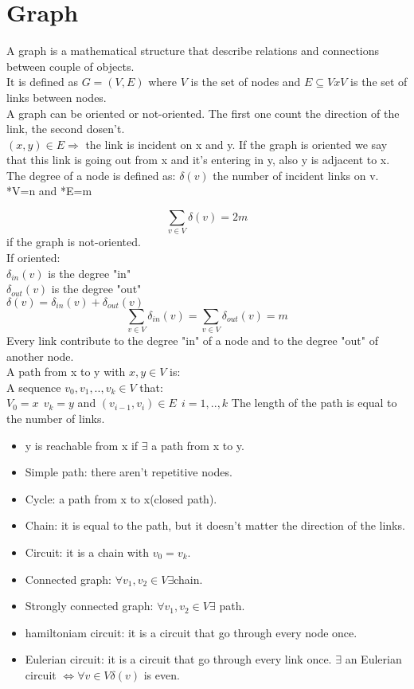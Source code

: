 \documentclass{article}
\begin{document}
\section{Graph}
A graph is a mathematical structure that describe relations and connections between couple of objects.\\
It is defined as $G = (V,E)$ where $V$ is the set of nodes and $E \subseteq VxV$ is the set of links between nodes.\\
A graph can be oriented or not-oriented. The first one count the direction of the link, the second dosen't.\\
$(x,y) \in E \Rightarrow$ the link is incident on x and y. If the graph is oriented we say that this link is going out from x and it's entering in y, also y is adjacent to x.\\
The degree of a node is defined as: $\delta(v)$ the number of incident links on v.\\
*V=n and *E=m \\
\begin{large}
$$\sum_{v \in V} \delta(v) = 2m$$ if the graph is not-oriented.\\
If oriented: \\
$\delta_{in}(v)$ is the degree "in"\\
$\delta_{out}(v)$ is the degree "out"\\
$\delta(v) = \delta_{in}(v) + \delta_{out}(v)$
$$\sum_{v \in V} \delta_{in}(v) = \sum_{v \in V} \delta_{out}(v) = m$$
Every link contribute to the degree "in" of a node and to the degree "out" of another node.\\
A path from x to y with $x,y \in V$ is:\\
A sequence $v_0,v_1,..,v_k \in V$ that:\\
$V_0=x \ \ v_k=y$ and $(v_{i-1},v_i) \in E \ \ i=1,..,k$
The length of the path is equal to the number of links.\\

\begin{itemize}
\item y is reachable from x if $\exists$ a path from x to y.
\item Simple path: there aren't repetitive nodes.
\item Cycle: a path from x to x(closed path).
\item Chain: it is equal to the path, but it doesn't matter the direction of the links.
\item Circuit: it is a chain with $v_0=v_k$.
\item Connected graph: $\forall v_1,v_2 \in V \exists $chain.
\item Strongly connected graph: $\forall v_1,v_2 \in V \exists $ path.
\item hamiltoniam circuit: it is a circuit that go through every node once.
\item Eulerian circuit: it is a circuit that go through every link once. $\exists$ an Eulerian circuit $\Leftrightarrow \forall v \in V \delta(v)$ is even.
\end{itemize}
\end{large}
\end{document}
